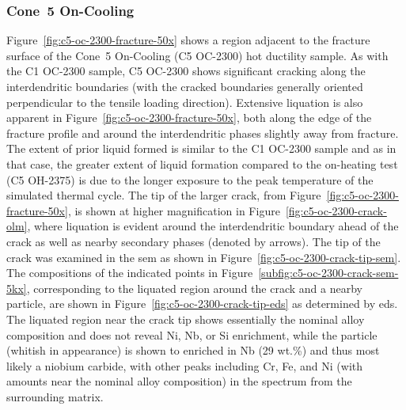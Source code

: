 {\subsubsection{Cone~5 On-Cooling}
Figure~\ref{fig:c5-oc-2300-fracture-50x} shows a region adjacent to the fracture surface of the Cone~5 On-Cooling  (C5 OC-2300) hot ductility sample. As with the C1 OC-2300 sample, C5 OC-2300 shows significant cracking along the interdendritic boundaries (with the cracked boundaries generally oriented perpendicular to the tensile loading direction). Extensive liquation is also apparent in Figure~\ref{fig:c5-oc-2300-fracture-50x}, both along the edge of the fracture profile and around the interdendritic phases slightly away from fracture. The extent of prior liquid formed is similar to the C1 OC-2300 sample and as in that case, the greater extent of liquid formation compared to the on-heating test (C5 OH-2375) is due to the longer exposure to the peak temperature of the simulated thermal cycle. The tip of the larger crack, from Figure~\ref{fig:c5-oc-2300-fracture-50x}, is shown at higher magnification in Figure~\ref{fig:c5-oc-2300-crack-olm}, where liquation is evident around the interdendritic boundary ahead of the crack as well as nearby secondary phases (denoted by arrows). The tip of the crack was examined in the \gls{sem} as shown in Figure~\ref{fig:c5-oc-2300-crack-tip-sem}. The compositions of the indicated points in Figure~\ref{subfig:c5-oc-2300-crack-sem-5kx}, corresponding to the liquated region around the crack and a nearby particle, are shown in Figure~\ref{fig:c5-oc-2300-crack-tip-eds} as determined by \gls{eds}. The liquated region near the crack tip shows essentially the nominal alloy composition and does not reveal Ni, Nb, or Si enrichment, while the particle (whitish in appearance) is shown to enriched in Nb (29 wt.\%) and thus most likely a niobium carbide, with other peaks including Cr, Fe, and Ni (with amounts near the nominal alloy composition) in the spectrum from the surrounding matrix.

}
